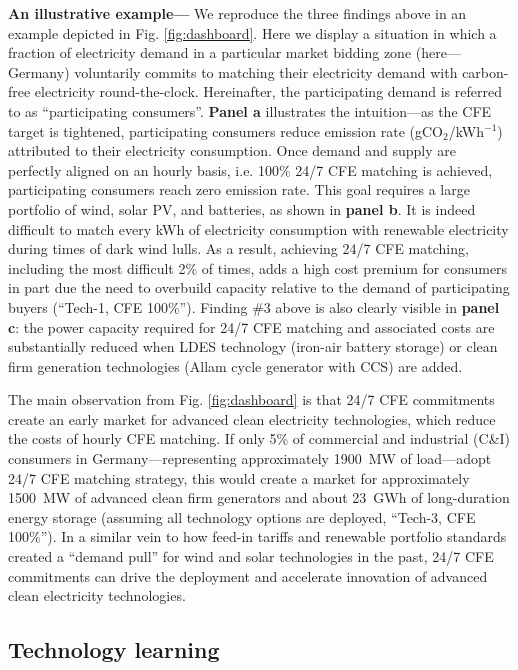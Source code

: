 \documentclass[pdflatex,sn-basic, Numbered]{sn-jnl}
\theoremstyle{thmstyleone}%
\theoremstyle{thmstyletwo}%
\theoremstyle{thmstylethree}%
\begin{document}
\textbf{An illustrative example---} We reproduce the three findings above in an example depicted in Fig. \ref{fig:dashboard}.
Here we display a situation in which a fraction of electricity demand in a particular market bidding zone (here---Germany) voluntarily commits to matching their electricity demand with carbon-free electricity round-the-clock.
Hereinafter, the participating demand is referred to as \enquote{participating consumers}.
\textbf{Panel a} illustrates the intuition---as the CFE target is tightened, participating consumers reduce emission rate (gCO$_2$/kWh$^{-1}$) attributed to their electricity consumption. Once demand and supply are perfectly aligned on an hourly basis, i.e. 100\% 24/7 CFE matching is achieved, participating consumers reach zero emission rate. This goal requires a large portfolio of wind, solar PV, and batteries, as shown in \textbf{panel b}. It is indeed difficult to match every kWh of electricity consumption with renewable electricity during times of dark wind lulls. As a result, achieving 24/7 CFE matching, including the most difficult 2\% of times, adds a high cost premium for consumers in part due the need to overbuild capacity relative to the demand of participating buyers (\enquote{Tech-1, CFE 100\%}). Finding \#3 above is also clearly visible in \textbf{panel c}: the power capacity required for 24/7 CFE matching and associated costs are substantially reduced when LDES technology (iron-air battery storage) or clean firm generation technologies (Allam cycle generator with CCS) are added.

The main observation from Fig. \ref{fig:dashboard} is that 24/7 CFE commitments create an early market for advanced clean electricity technologies, which reduce the costs of hourly CFE matching.
If only 5\% of commercial and industrial (C\&I) consumers in Germany---representing approximately 1900~MW of load---adopt 24/7 CFE matching strategy, this would create a market for approximately 1500~MW of advanced clean firm generators and about 23~GWh of long-duration energy storage (assuming all technology options are deployed,
\enquote{Tech-3, CFE 100\%}).
In a similar vein to how feed-in tariffs and renewable portfolio standards created a \enquote{demand pull} for wind and solar technologies in the past, 24/7 CFE commitments can drive the deployment and accelerate innovation of advanced clean electricity technologies.

\subsection*{Technology learning}\label{sec3}
\end{document}
